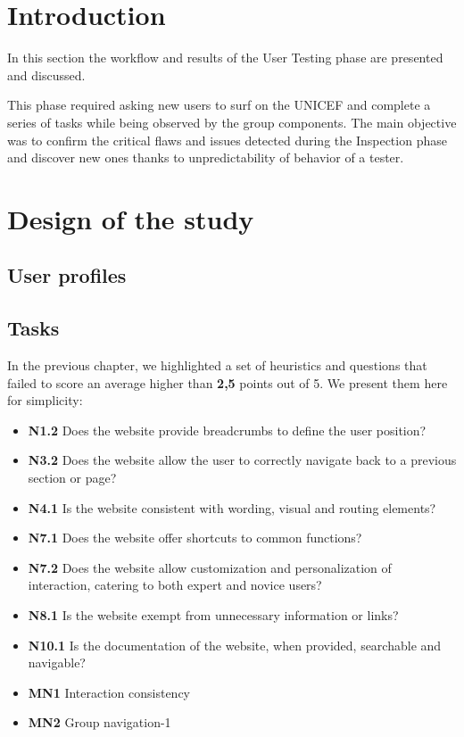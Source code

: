 \section{Introduction}
In this section the workflow and results of the User Testing phase are presented and discussed.

This phase required asking new users to surf on the UNICEF and complete a series of tasks while being observed by the group components. The main objective was to confirm the critical flaws and issues detected during the Inspection phase and discover new ones thanks to unpredictability of behavior of a tester.

\section{Design of the study}
\subsection{User profiles}

\subsection{Tasks}
In the previous chapter, we highlighted a set of heuristics and questions that failed to score an average higher than \textbf{2,5} points out of 5. We present them here for simplicity:
\begin{itemize}
	\item \textbf{N1.2} Does the website provide breadcrumbs to define the user position?
	\item \textbf{N3.2} Does the website allow the user to correctly navigate back to a previous section or page?
	\item \textbf{N4.1} Is the website consistent with wording, visual and routing elements?
	\item \textbf{N7.1} Does the website offer shortcuts to common functions?
	\item \textbf{N7.2} Does the website allow customization and personalization of interaction, catering to both expert and novice users?
	\item \textbf{N8.1} Is the website exempt from unnecessary information or links?
	\item \textbf{N10.1} Is the documentation of the website, when provided, searchable and navigable?
	\item \textbf{MN1} Interaction consistency
	\item \textbf{MN2} Group navigation-1
\end{itemize}

